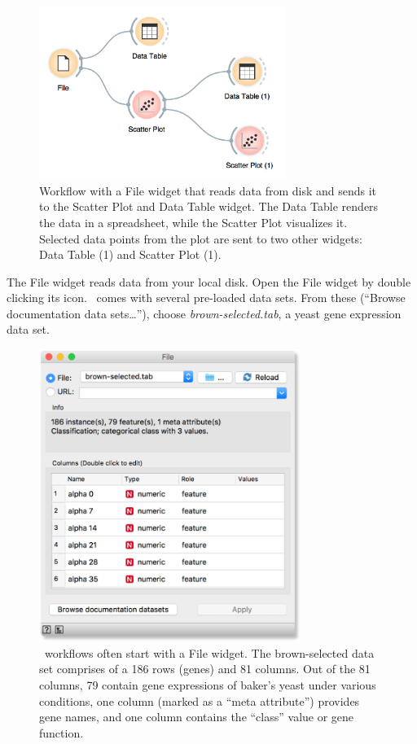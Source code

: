 \begin{figure}[h]
  \centering
  \includegraphics[width=80mm]{graphics/ch-workflows/workflow-fig2.png}%
  \caption{Workflow with a File widget that reads data from disk and sends it to the Scatter Plot and Data Table widget. The Data Table renders the data in a spreadsheet, while the Scatter Plot visualizes it. Selected data points from the plot are sent to two other widgets: Data Table (1) and Scatter Plot (1).}
  \label{fig:workflow-fig2}
\end{figure}

The File widget reads data from your local disk. Open the File widget by double clicking its icon. \mutation\  comes with several pre-loaded data sets. From these (“Browse documentation data sets…”), choose \textit{brown-selected.tab}, a yeast gene expression data set.

\begin{figure}[h]
  \centering
  \includegraphics[width=85mm]{graphics/ch-workflows/workflow-fig3.png}%
  \caption{\mutation\  workflows often start with a File widget. The brown-selected data set comprises of a 186 rows (genes) and 81 columns. Out of the 81 columns, 79 contain gene expressions of baker’s yeast under various conditions, one column (marked as a “meta attribute”) provides gene names, and one column contains the “class” value or gene function.}
  \label{fig:workflow-fig3}
\end{figure}

